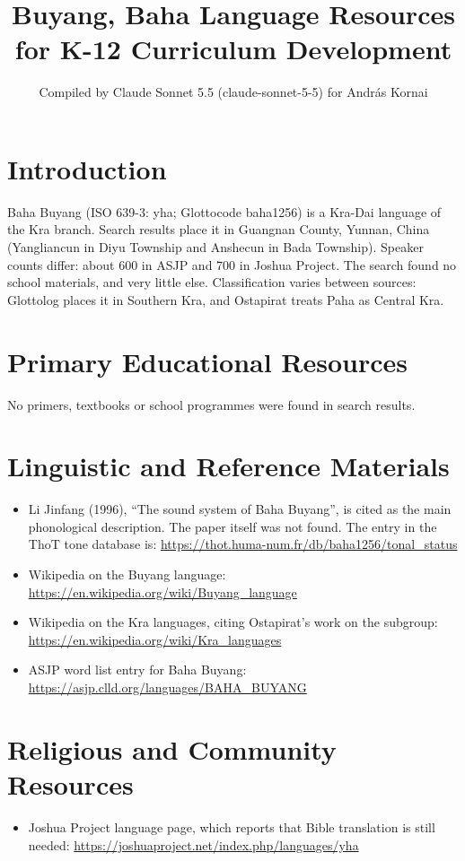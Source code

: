 \documentclass[12pt]{article}
\title{Buyang, Baha Language Resources for K-12 Curriculum Development}
\author{Compiled by Claude Sonnet 5.5 (claude-sonnet-5-5) for Andr\'as Kornai}
\date{}
\begin{document}
\maketitle

\section{Introduction}
Baha Buyang (ISO 639-3: yha; Glottocode baha1256) is a Kra-Dai language of the Kra branch. Search results place it in Guangnan County, Yunnan, China (Yangliancun in Diyu Township and Anshecun in Bada Township). Speaker counts differ: about 600 in ASJP and 700 in Joshua Project. The search found no school materials, and very little else. Classification varies between sources: Glottolog places it in Southern Kra, and Ostapirat treats Paha as Central Kra.

\section{Primary Educational Resources}
No primers, textbooks or school programmes were found in search results.

\section{Linguistic and Reference Materials}
\begin{itemize}
\item Li Jinfang (1996), ``The sound system of Baha Buyang'', is cited as the main phonological description. The paper itself was not found. The entry in the ThoT tone database is: \url{https://thot.huma-num.fr/db/baha1256/tonal_status}
\item Wikipedia on the Buyang language: \url{https://en.wikipedia.org/wiki/Buyang_language}
\item Wikipedia on the Kra languages, citing Ostapirat's work on the subgroup: \url{https://en.wikipedia.org/wiki/Kra_languages}
\item ASJP word list entry for Baha Buyang: \url{https://asjp.clld.org/languages/BAHA_BUYANG}
\end{itemize}

\section{Religious and Community Resources}
\begin{itemize}
\item Joshua Project language page, which reports that Bible translation is still needed: \url{https://joshuaproject.net/index.php/languages/yha}
\end{itemize}
\end{document}
